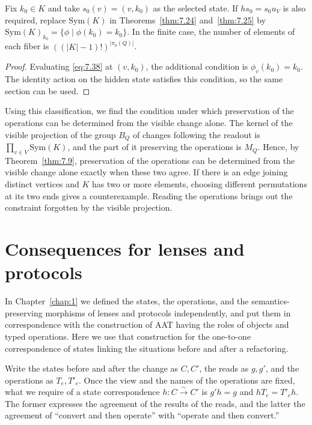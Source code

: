\begin{corollary}\label{cor:7.26}

Fix $k_0\in K$ and take $s_0(v)=(v,k_0)$ as the selected state.
If $hs_0=s_0u_V$ is also required, replace $\mathrm{Sym}(K)$ in
Theorems~\ref{thm:7.24} and~\ref{thm:7.25} by
$\mathrm{Sym}(K)_{k_0}=\{\phi\mid\phi(k_0)=k_0\}$.
In the finite case, the number of elements of each fiber is $((|K|-1)!)^{|\pi_0(Q)|}$.

\end{corollary}

\begin{proof}

Evaluating \eqref{eq:7.38} at $(v,k_0)$, the additional condition is $\phi_v(k_0)=k_0$.
The identity action on the hidden state satisfies this condition, so the same section can be
used.

\end{proof}

Using this classification, we find the condition under which preservation of the operations
can be determined from the visible change alone.
The kernel of the visible projection of the group $B_Q$ of changes following the readout is
$\prod_{v\in V}\mathrm{Sym}(K)$, and the part of it preserving the operations is $M_Q$.
Hence, by Theorem~\ref{thm:7.9}, preservation of the operations can be determined from the
visible change alone exactly when these two agree.
If there is an edge joining distinct vertices and $K$ has two or more elements, choosing
different permutations at its two ends gives a counterexample.
Reading the operations brings out the constraint forgotten by the visible projection.

\section{Consequences for lenses and protocols}\label{sec:7.8}

In Chapter~\ref{chap:1} we defined the states, the operations, and the
semantics-preserving morphisms of lenses and protocols independently, and put them in
correspondence with the construction of AAT having the roles of objects and typed operations.
Here we use that construction for the one-to-one correspondence of states linking the
situations before and after a refactoring.

Write the states before and after the change as $C,C'$, the reads as $g,g'$, and the
operations as $T_e,T'_e$.
Once the view and the names of the operations are fixed, what we require of a state
correspondence $h:C\xrightarrow{\sim}C'$ is $g'h=g$ and $hT_e=T'_eh$.
The former expresses the agreement of the results of the reads, and the latter the agreement
of ``convert and then operate'' with ``operate and then convert.''

